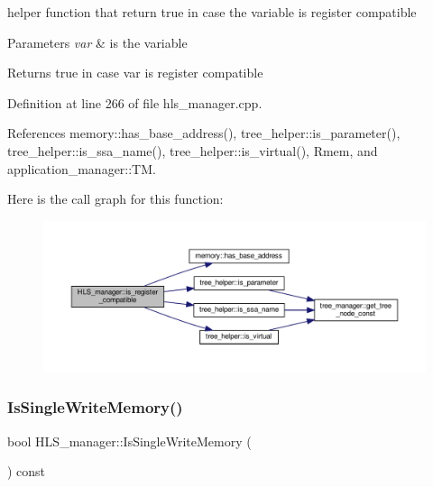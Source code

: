 helper function that return true in case the variable is register compatible 


\begin{DoxyParams}{Parameters}
{\em var} & is the variable \\
\hline
\end{DoxyParams}
\begin{DoxyReturn}{Returns}
true in case var is register compatible 
\end{DoxyReturn}


Definition at line 266 of file hls\+\_\+manager.\+cpp.



References memory\+::has\+\_\+base\+\_\+address(), tree\+\_\+helper\+::is\+\_\+parameter(), tree\+\_\+helper\+::is\+\_\+ssa\+\_\+name(), tree\+\_\+helper\+::is\+\_\+virtual(), Rmem, and application\+\_\+manager\+::\+TM.

Here is the call graph for this function\+:
\nopagebreak
\begin{figure}[H]
\begin{center}
\leavevmode
\includegraphics[width=350pt]{dc/dd7/classHLS__manager_afb452aef787733de4a11d00cc4e1f36a_cgraph}
\end{center}
\end{figure}
\mbox{\label{classHLS__manager_a022c7d48031f428b5814d0493ac46d1e}} 
\subsubsection{\texorpdfstring{Is\+Single\+Write\+Memory()}{IsSingleWriteMemory()}}
{\footnotesize\ttfamily bool H\+L\+S\+\_\+manager\+::\+Is\+Single\+Write\+Memory (\begin{DoxyParamCaption}{ }\end{DoxyParamCaption}) const}



